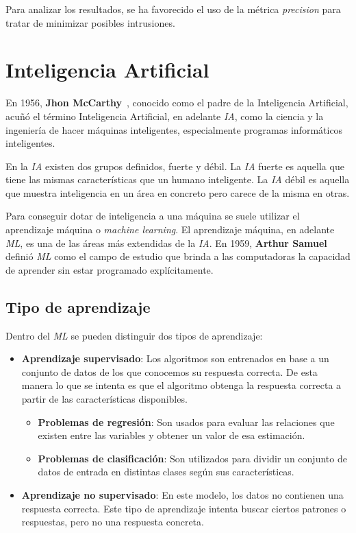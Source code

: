 Para analizar los resultados, se ha favorecido el uso de la métrica \textit{precision} para tratar de minimizar posibles intrusiones.



\section{Inteligencia Artificial}

En 1956, \textbf{Jhon McCarthy}~\cite{jhonmccarthy}, conocido como el padre de la Inteligencia Artificial, acuñó el término Inteligencia Artificial, en adelante \textit{IA}, como la ciencia y la ingeniería de hacer máquinas inteligentes, especialmente programas informáticos inteligentes.

En la \textit{IA} existen dos grupos definidos, fuerte y débil. La  \textit{IA} fuerte es aquella que tiene las mismas características que un humano inteligente. La \textit{IA} débil es aquella que muestra inteligencia en un área en concreto pero carece de la misma en otras.

Para conseguir dotar de inteligencia a una máquina se suele utilizar el aprendizaje máquina o \textit{machine learning}. El aprendizaje máquina, en adelante \textit{ML}, es una de las áreas más extendidas de la \textit{IA}. En 1959, \textbf{Arthur Samuel}~\cite{arhtursamuel} definió \textit{ML} como el campo de estudio que brinda a las computadoras la capacidad de aprender sin estar programado explícitamente.

\subsection{Tipo de aprendizaje}

Dentro del \textit{ML} se pueden distinguir dos tipos de aprendizaje:

\begin{itemize}
    \item \textbf{Aprendizaje supervisado}: Los algoritmos son entrenados en base a un conjunto de datos de los que conocemos su respuesta correcta. De esta manera lo que se intenta es que el algoritmo obtenga la respuesta correcta a partir de las características disponibles.
    
    \begin{itemize}
        \item \textbf{Problemas de regresión}: Son usados para evaluar las relaciones que existen entre las variables y obtener un valor de esa estimación.
        \item \textbf{Problemas de clasificación}: Son utilizados para dividir un conjunto de datos de entrada en distintas clases según sus características.
    \end{itemize}
    
    \item \textbf{Aprendizaje no supervisado}: En este modelo, los datos no contienen una respuesta correcta. Este tipo de aprendizaje intenta buscar ciertos patrones o respuestas, pero no una respuesta concreta.
\end{itemize}

